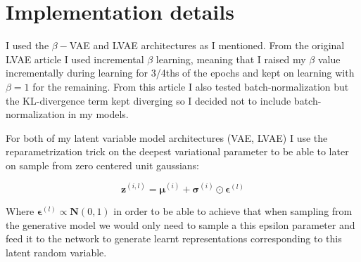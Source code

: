 \documentclass[11pt, english]{article}
\begin{document}
\section{Implementation details}

\par I used the $\beta-$VAE and LVAE architectures as I mentioned. From the original LVAE article \cite{sonderby2016ladder} I used incremental $\beta$ learning, meaning that I raised my $\beta$ value incrementally during learning for 3/4ths of the epochs and kept on learning with $\beta = 1$ for the remaining. From this article I also tested batch-normalization but the KL-divergence term kept diverging so I decided not to include batch-normalization in my models.

\vspace{5mm}

\par For both of my latent variable model architectures (VAE, LVAE) I use the reparametrization trick on the deepest variational parameter to be able to later on sample from zero centered unit gaussians:

\begin{equation}
    \boldsymbol{z}^{(i, l)} = \boldsymbol{\mu}^{(i)} + \boldsymbol{\sigma}^{(i)} \odot \boldsymbol{\epsilon}^{(l)}
\end{equation}

\par Where $\boldsymbol{\epsilon}^{(l)} \propto \boldsymbol{N}(0, 1)$ in order to be able to achieve that when sampling from the generative model we would only need to sample a this epsilon parameter and feed it to the network to generate learnt representations corresponding to this latent random variable.

\par 

\newpage
\printbibliography
\end{document}
